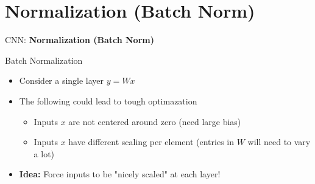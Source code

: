 \section{Normalization (Batch Norm)}
\begin{frame}{}
    \LARGE CNN: \textbf{Normalization (Batch Norm)}
\end{frame}

\begin{frame}[allowframebreaks]{Batch Normalization}
    \begin{itemize}
        \item Consider a single layer $y=Wx$
        \item The following could lead to tough optimazation
        \begin{itemize}
            \item Inputs $x$ are not centered around zero (need large bias)
            \item Inputs $x$ have different scaling per element (entries in $W$ will need to vary a lot)
        \end{itemize}
        \pause
        \item \textbf{Idea:} Force inputs to be "nicely scaled" at each layer!
    \end{itemize}
    
\framebreak


\end{frame}
